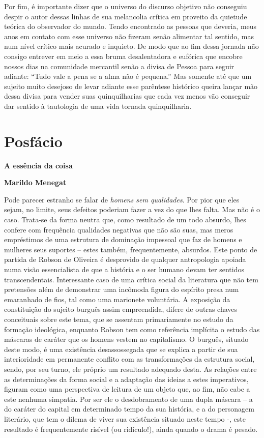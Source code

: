 Por fim, é importante dizer que o universo do discurso objetivo não
conseguiu despir o autor dessas linhas de sua melancolia crítica em
proveito da quietude teórica do observador do mundo. Tendo encontrado as
pessoas que deveria, meus anos em contato com esse universo não fizeram
senão alimentar tal sentido, mas num nível crítico mais acurado e
inquieto. De modo que ao fim dessa jornada não consigo entrever em meio
a essa bruma desalentadora e eufórica que encobre nossos dias na
comunidade mercantil senão a divisa de Pessoa para seguir adiante:
``Tudo vale a pena se a alma não é pequena.'' Mas somente até que um
sujeito muito desejoso de levar adiante esse parêntese histórico queira
lançar mão dessa divisa para vender suas quinquilharias que cada vez
menos vão conseguir dar sentido à tautologia de uma vida tornada
quinquilharia.

\chapter{Posfácio}

\textbf{A essência da coisa}

\textbf{Marildo Menegat}

Pode parecer estranho se falar de \emph{homens sem qualidades}. Por pior
que eles sejam, no limite, seus defeitos poderiam fazer a vez do que
lhes falta. Mas não é o caso. Trata-se da forma neutra que, como
resultado de um todo absurdo, lhes confere com frequência qualidades
negativas que não são suas, mas meros empréstimos de uma estrutura de
dominação impessoal que faz de homens e mulheres seus suportes -- estes
também, frequentemente, absurdos. Este ponto de partida de Robson de
Oliveira é desprovido de qualquer antropologia apoiada numa visão
essencialista de que a história e o ser humano devam ter sentidos
transcendentais. Interessante caso de uma crítica social da literatura
que não tem pretensões além de demonstrar uma incômoda figura do
espírito presa num emaranhado de fios, tal como uma marionete
voluntária. A exposição da constituição do sujeito burguês assim
empreendida, difere de outras chaves conceituais sobre este tema, que se
assentam primariamente no estudo da formação ideológica, enquanto Robson
tem como referência implícita o estudo das máscaras de caráter que os
homens vestem no capitalismo. O burguês, situado deste modo, é uma
existência desassossegada que se explica a partir de sua interioridade
em permanente conflito com as transformações da estrutura social, sendo,
por seu turno, ele próprio um resultado adequado desta. As relações
entre as determinações da forma social e a adaptação das ideias a estes
imperativos, figuram como uma perspectiva de leitura de um objeto que,
ao fim, não cabe a este nenhuma simpatia. Por ser ele o desdobramento de
uma dupla máscara -- a do caráter do capital em determinado tempo da sua
história, e a do personagem literário, que tem o dilema de viver sua
existência situado neste tempo -, este resultado é frequentemente
risível (ou ridículo!), ainda quando o drama é pesado.


